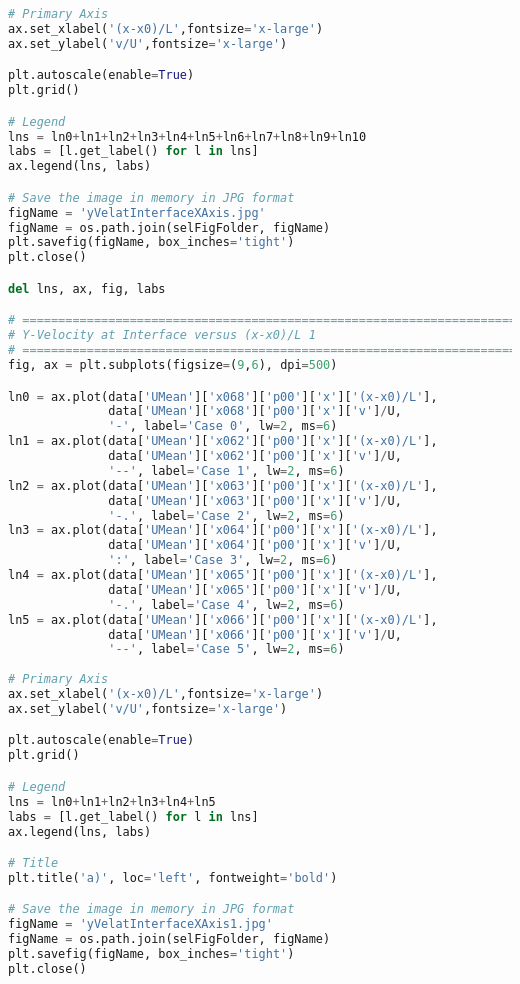 \begin{lstlisting}[language=python]
# Primary Axis
ax.set_xlabel('(x-x0)/L',fontsize='x-large')
ax.set_ylabel('v/U',fontsize='x-large')

plt.autoscale(enable=True)
plt.grid()

# Legend
lns = ln0+ln1+ln2+ln3+ln4+ln5+ln6+ln7+ln8+ln9+ln10
labs = [l.get_label() for l in lns]
ax.legend(lns, labs)

# Save the image in memory in JPG format
figName = 'yVelatInterfaceXAxis.jpg'
figName = os.path.join(selFigFolder, figName)
plt.savefig(figName, box_inches='tight')
plt.close()

del lns, ax, fig, labs

# =============================================================================
# Y-Velocity at Interface versus (x-x0)/L 1
# =============================================================================
fig, ax = plt.subplots(figsize=(9,6), dpi=500)

ln0 = ax.plot(data['UMean']['x068']['p00']['x']['(x-x0)/L'],
              data['UMean']['x068']['p00']['x']['v']/U,
              '-', label='Case 0', lw=2, ms=6)
ln1 = ax.plot(data['UMean']['x062']['p00']['x']['(x-x0)/L'],
              data['UMean']['x062']['p00']['x']['v']/U,
              '--', label='Case 1', lw=2, ms=6)
ln2 = ax.plot(data['UMean']['x063']['p00']['x']['(x-x0)/L'],
              data['UMean']['x063']['p00']['x']['v']/U,
              '-.', label='Case 2', lw=2, ms=6)
ln3 = ax.plot(data['UMean']['x064']['p00']['x']['(x-x0)/L'],
              data['UMean']['x064']['p00']['x']['v']/U,
              ':', label='Case 3', lw=2, ms=6)
ln4 = ax.plot(data['UMean']['x065']['p00']['x']['(x-x0)/L'],
              data['UMean']['x065']['p00']['x']['v']/U,
              '-.', label='Case 4', lw=2, ms=6)
ln5 = ax.plot(data['UMean']['x066']['p00']['x']['(x-x0)/L'],
              data['UMean']['x066']['p00']['x']['v']/U,
              '--', label='Case 5', lw=2, ms=6)
    
# Primary Axis
ax.set_xlabel('(x-x0)/L',fontsize='x-large')
ax.set_ylabel('v/U',fontsize='x-large')

plt.autoscale(enable=True)
plt.grid()

# Legend
lns = ln0+ln1+ln2+ln3+ln4+ln5
labs = [l.get_label() for l in lns]
ax.legend(lns, labs)

# Title
plt.title('a)', loc='left', fontweight='bold')

# Save the image in memory in JPG format
figName = 'yVelatInterfaceXAxis1.jpg'
figName = os.path.join(selFigFolder, figName)
plt.savefig(figName, box_inches='tight')
plt.close()


\end{lstlisting}

